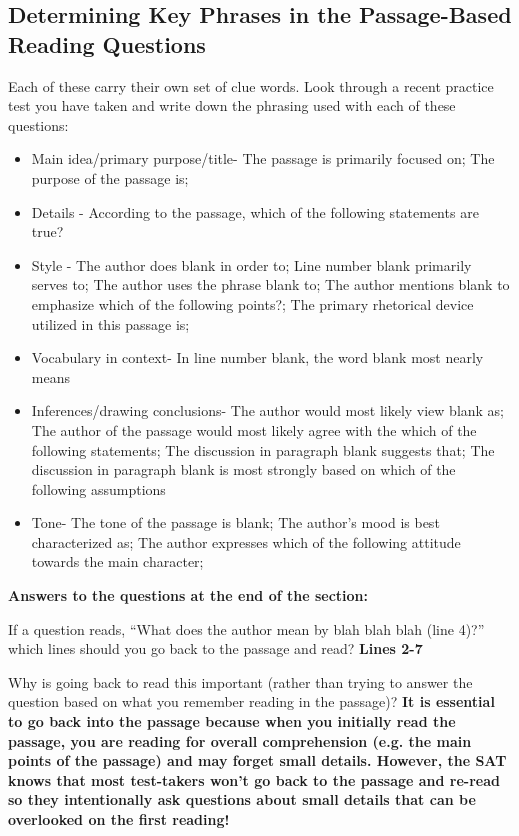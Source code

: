 \begin{enumerate}
\subsection{Determining Key Phrases in the Passage-Based Reading Questions}
Each of these carry their own set of clue words. Look through a recent practice test you have taken and write down the phrasing used with each of these questions: 
\begin{itemize}
\item Main idea/primary purpose/title- The passage is primarily focused on; The purpose of the passage is; 
\item Details
- According to the passage, which of the following statements are true?
\item Style
- The author does blank in order to; Line number blank primarily serves to; The author uses the phrase blank to; The author mentions blank  to emphasize which of the following points?; The primary rhetorical device utilized in this passage is; 
\item Vocabulary in context- In line number blank, the word blank most nearly means
\item Inferences/drawing conclusions- The author would most likely view blank as; The author of the passage would most likely agree with the which of the following statements; The discussion in paragraph blank suggests that; The discussion in paragraph blank is most strongly based on which of the following assumptions
\item Tone- The tone of the passage is blank; The author’s mood is best characterized as; The author expresses which of the following attitude towards the main character; 
\end{itemize}

\textbf{Answers to the questions at the end of the section:}

\bigskip
If a question reads, “What does the author mean by blah blah blah (line 4)?” which lines should you go back to the passage and read? \textbf{Lines 2-7}

\bigskip
Why is going back to read this important (rather than trying to answer the question based on what you remember reading in the passage)? \textbf{It is essential to go back into the passage because when you initially read the passage, you are reading for overall comprehension (e.g. the main points of the passage) and may forget small details. However, the SAT knows that most test-takers won’t go back to the passage and re-read so they intentionally ask questions about small details that can be overlooked on the first reading!}


\end{enumerate}
